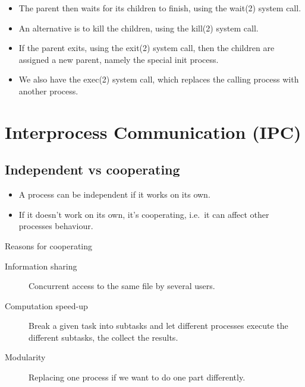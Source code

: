 \documentclass{beamer}
\begin{document}
\begin{frame}{\insertsubsectionhead}
  \begin{itemize}
    \item The parent then waits for its children to finish, using the wait(2) 
      system call.

    \item An alternative is to kill the children, using the kill(2) system 
      call.

    \item If the parent exits, using the exit(2) system call, then the children 
      are assigned a new parent, namely the special init process.
  \end{itemize}
\end{frame}

\begin{frame}{\insertsubsectionhead}
  \begin{itemize}
    \item We also have the exec(2) system call, which replaces the calling 
      process with another process.
  \end{itemize}
\end{frame}

\section[IPC]{Interprocess Communication (IPC)}

\subsection{Independent vs cooperating}

\begin{frame}{\insertsubsectionhead}
  \begin{itemize}
    \item A process can be independent if it works on its own.
    \item If it doesn't work on its own, it's cooperating, i.e.\ it can affect 
      other processes behaviour.
  \end{itemize}
\end{frame}

\begin{frame}{\insertsubsectionhead}{Reasons for cooperating}
  \begin{description}
    \item[Information sharing] Concurrent access to the same file by several 
      users.

    \item[Computation speed-up] Break a given task into subtasks and let 
      different processes execute the different subtasks, the collect the 
      results.

    \item[Modularity] Replacing one process if we want to do one part 
      differently.
  \end{description}
\end{frame}
\end{document}
